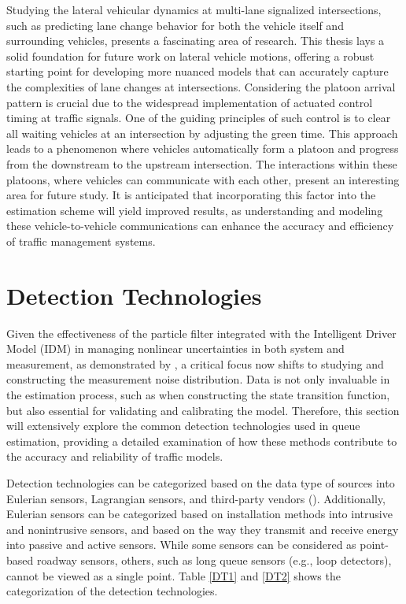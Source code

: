 Studying the lateral vehicular dynamics at multi-lane signalized intersections, such as predicting lane change behavior for both the vehicle itself and surrounding vehicles, presents a fascinating area of research.  This thesis lays a solid foundation for future work on lateral vehicle motions, offering a robust starting point for developing more nuanced models that can accurately capture the complexities of lane changes at intersections. Considering the platoon arrival pattern is crucial due to the widespread implementation of actuated control timing at traffic signals. One of the guiding principles of such control is to clear all waiting vehicles at an intersection by adjusting the green time. This approach leads to a phenomenon where vehicles automatically form a platoon and progress from the downstream to the upstream intersection. The interactions within these platoons, where vehicles can communicate with each other, present an interesting area for future study. It is anticipated that incorporating this factor into the estimation scheme will yield improved results, as understanding and modeling these vehicle-to-vehicle communications can enhance the accuracy and efficiency of traffic management systems.

\section{Detection Technologies}\label{detection technologies}

Given the effectiveness of the particle filter integrated with the Intelligent Driver Model (IDM) in managing nonlinear uncertainties in both system and measurement, as demonstrated by \textcite{xie2018generic}, a critical focus now shifts to studying and constructing the measurement noise distribution. Data is not only invaluable in the estimation process, such as when constructing the state transition function, but also essential for validating and calibrating the model. Therefore, this section will extensively explore the common detection technologies used in queue estimation, providing a detailed examination of how these methods contribute to the accuracy and reliability of traffic models.

Detection technologies can be categorized based on the data type of sources into Eulerian sensors, Lagrangian sensors, and third-party vendors (\textcite{klein2024roadside}). Additionally, Eulerian sensors can be categorized based on installation methods into intrusive and nonintrusive sensors, and based on the way they transmit and receive energy into passive and active sensors. While some sensors can be considered as point-based roadway sensors, others, such as long queue sensors (e.g., loop detectors), cannot be viewed as a single point. Table \ref{DT1} and \ref{DT2} shows the categorization of the detection technologies. 

